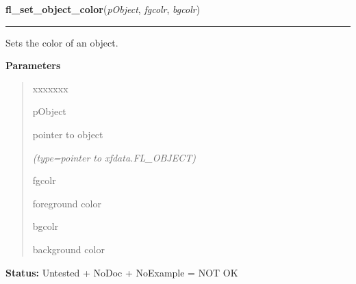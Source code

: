 \hspace{.8\funcindent}\begin{boxedminipage}{\funcwidth}

    \raggedright \textbf{fl\_set\_object\_color}(\textit{pObject}, \textit{fgcolr}, \textit{bgcolr})

    \vspace{-1.5ex}

    \rule{\textwidth}{0.5\fboxrule}
\setlength{\parskip}{2ex}
    Sets the color of an object.

\setlength{\parskip}{1ex}
      \textbf{Parameters}
      \vspace{-1ex}

      \begin{quote}
        \begin{Ventry}{xxxxxxx}

          \item[pObject]

          pointer to object

            {\it (type=pointer to xfdata.FL\_OBJECT)}

          \item[fgcolr]

          foreground color

          \item[bgcolr]

          background color

        \end{Ventry}

      \end{quote}

\textbf{Status:} Untested + NoDoc + NoExample = NOT OK



    \end{boxedminipage}

    \label{xformslib:library:fl_get_object_color}

    \vspace{0.5ex}

